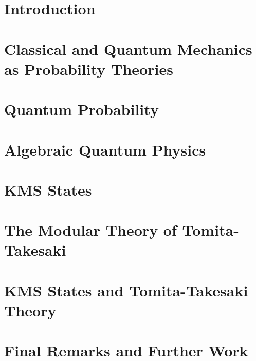 \documentclass[12pt]{report}
\theoremstyle{definition}
\begin{document}
\tableofcontents

\chapter{Introduction}


\chapter{Classical and Quantum Mechanics as Probability Theories}\label{chp:axiom}


\chapter{Quantum Probability}\label{chp:logic}


\chapter{Algebraic Quantum Physics}\label{chp:algebra}


\chapter{KMS States}\label{chp:KMS}


\chapter{The Modular Theory of Tomita-Takesaki}\label{chp:tomita}


\chapter{KMS States and Tomita-Takesaki Theory}\label{chp:final}


\chapter{Final Remarks and Further Work}




\end{document}
